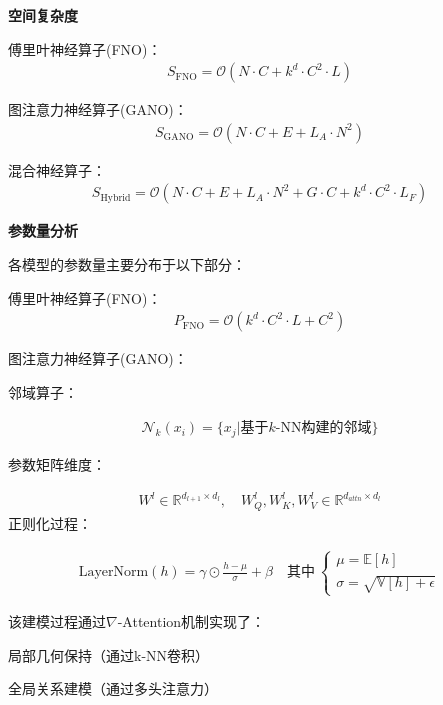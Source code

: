 \documentclass{MMCStyle}
\begin{document}
\textbf{ 空间复杂度}

傅里叶神经算子(FNO)：  
    \begin{eqnarray} 
    S_{\mathrm{FNO}}=\mathcal{O}(N\cdot C+k^{d}\cdot C^{2}\cdot L)
    \end{eqnarray}

图注意力神经算子(GANO)：
    \begin{eqnarray} 
    S_{\mathrm{GANO}}=\mathcal{O}(N\cdot C+E+L_{A}\cdot N^{2})
    \end{eqnarray}

混合神经算子：  
    \begin{eqnarray} 
    S_{\mathrm{Hybrid}}=\mathcal{O}(N\cdot C+E+L_{A}\cdot N^{2}+G\cdot C+k^{d}\cdot C^{2}\cdot L_{F})
    \end{eqnarray}

\textbf{参数量分析}

各模型的参数量主要分布于以下部分：  

傅里叶神经算子(FNO)：
\begin{eqnarray}
    P_{\mathrm{{FNO}}}=\mathcal{O}(k^{d}\cdot C^{2}\cdot L+C^{2})
\end{eqnarray}

图注意力神经算子(GANO)：

邻域算子：

    \begin{eqnarray} 
    \mathcal{N}_k(x_i) = \{x_j | \text{基于}k\text{-NN构建的邻域}\}
    \end{eqnarray}

参数矩阵维度：

    \begin{eqnarray} 
    W^l \in \mathbb{R}^{d_{l+1} \times d_l}, \quad 
W_Q^l, W_K^l, W_V^l \in \mathbb{R}^{d_{attn} \times d_l}
    \end{eqnarray}
正则化过程：

    \begin{eqnarray} 
    \text{LayerNorm}(h) = \gamma \odot \frac{h - \mu}{\sigma} + \beta \quad 
\text{其中} \ 
\begin{cases}
\mu = \mathbb{E}[h] \\
\sigma = \sqrt{\mathbb{V}[h] + \epsilon}
\end{cases}
    \end{eqnarray}

该建模过程通过$\nabla$-Attention机制实现了：

局部几何保持（通过k-NN卷积）

 全局关系建模（通过多头注意力）
\end{document}
